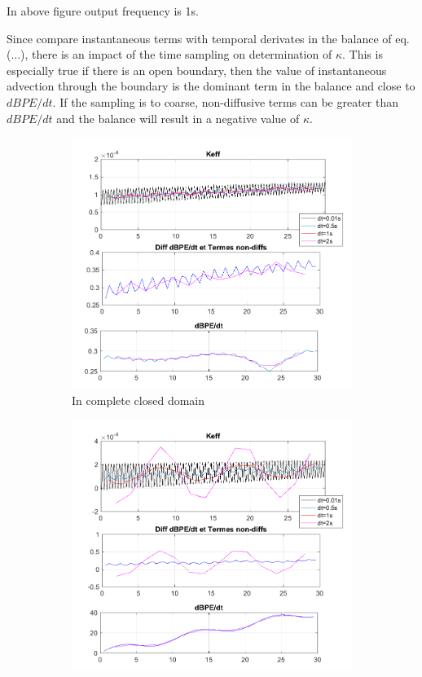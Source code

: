 In above figure output frequency is 1s.

Since compare instantaneous terms with temporal derivates in the balance of eq.(...), there is an impact of the time sampling on determination of $\kappa$. This is especially true if there is an open boundary, then the value of instantaneous advection through the boundary is the dominant term in the balance and close to $dBPE/dt$. If the sampling is to coarse, non-diffusive terms can be greater than $dBPE/dt$ and the balance will result in a negative value of $\kappa$.

\begin{figure}
\begin{subfigure}{.5\textwidth}
\includegraphics[width=1\textwidth]{./CHAP_BPE/figcompKAPPA_dt-out_psinAll.png}
\caption{In complete closed domain}
\end{subfigure}
\begin{subfigure}{.5\textwidth}
\includegraphics[width=1\textwidth]{./CHAP_BPE/figcompKAPPA_dt-out_psinL.png}

\end{subfigure}
\end{figure}

